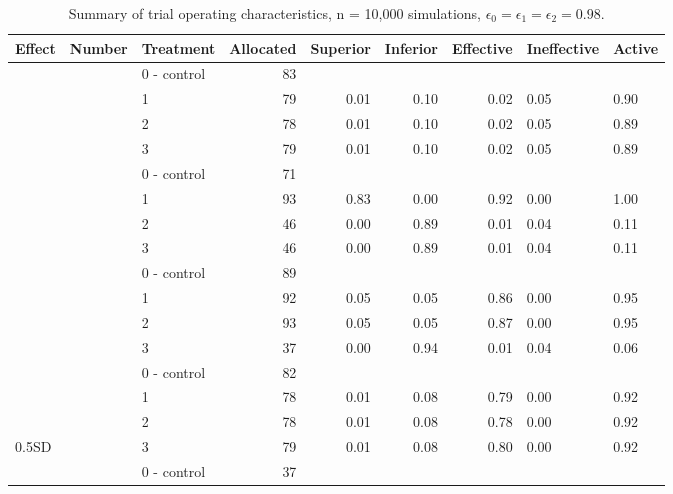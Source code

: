 \begin{table}[H]

\caption{Summary of trial operating characteristics, n = 10,000 simulations, $\epsilon_0=\epsilon_1=\epsilon_2=0.98$.}
\centering
\fontsize{9}{11}\selectfont
\begin{tabular}[t]{lllrrrrll}
\toprule
Effect & Number & Treatment & Allocated & Superior & Inferior & Effective & Ineffective & Active\\
\midrule
 &  & 0 - control & 83 &  &  &  &  & \\

 &  & 1 & 79 & 0.01 & 0.10 & 0.02 & 0.05 & 0.90\\

 &  & 2 & 78 & 0.01 & 0.10 & 0.02 & 0.05 & 0.89\\

\multirow[t]{-4}{*}{\raggedright\arraybackslash 0} & \multirow[t]{-4}{*}{\raggedright\arraybackslash 0} & 3 & 79 & 0.01 & 0.10 & 0.02 & 0.05 & 0.89\\
\cmidrule{1-9}
 &  & 0 - control & 71 &  &  &  &  & \\

 &  & 1 & 93 & 0.83 & 0.00 & 0.92 & 0.00 & 1.00\\

 &  & 2 & 46 & 0.00 & 0.89 & 0.01 & 0.04 & 0.11\\

 & \multirow[t]{-4}{*}{\raggedright\arraybackslash 1} & 3 & 46 & 0.00 & 0.89 & 0.01 & 0.04 & 0.11\\

 &  & 0 - control & 89 &  &  &  &  & \\

 &  & 1 & 92 & 0.05 & 0.05 & 0.86 & 0.00 & 0.95\\

 &  & 2 & 93 & 0.05 & 0.05 & 0.87 & 0.00 & 0.95\\

 & \multirow[t]{-4}{*}{\raggedright\arraybackslash 2} & 3 & 37 & 0.00 & 0.94 & 0.01 & 0.04 & 0.06\\

 &  & 0 - control & 82 &  &  &  &  & \\

 &  & 1 & 78 & 0.01 & 0.08 & 0.79 & 0.00 & 0.92\\

 &  & 2 & 78 & 0.01 & 0.08 & 0.78 & 0.00 & 0.92\\

\multirow[t]{-12}{*}{\raggedright\arraybackslash 0.5SD} & \multirow[t]{-4}{*}{\raggedright\arraybackslash 3} & 3 & 79 & 0.01 & 0.08 & 0.80 & 0.00 & 0.92\\
\cmidrule{1-9}
 &  & 0 - control & 37 &  &  &  &  & \\


\end{tabular}
\end{table}
